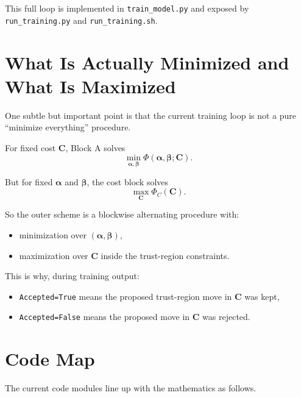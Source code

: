 \documentclass[11pt]{article}
\newcommand{\betavec}{\boldsymbol{\beta}}
\newcommand{\alphavec}{\boldsymbol{\alpha}}
\newcommand{\costvec}{\mathbf{C}}
\begin{document}
This full loop is implemented in \texttt{train\_model.py} and exposed by
\texttt{run\_training.py} and \texttt{run\_training.sh}.

\section{What Is Actually Minimized and What Is Maximized}

One subtle but important point is that the current training loop is not a pure
``minimize everything'' procedure.

For fixed cost $\costvec$, Block A solves
\begin{equation}
\label{eq:min-block-a}
\min_{\alphavec, \betavec}
\Phi(\alphavec, \betavec; \costvec).
\end{equation}

But for fixed $\alphavec$ and $\betavec$, the cost block solves
\begin{equation}
\label{eq:max-cost}
\max_{\costvec} \Phi_C(\costvec).
\end{equation}

So the outer scheme is a blockwise alternating procedure with:
\begin{itemize}
  \item minimization over $(\alphavec, \betavec)$,
  \item maximization over $\costvec$ inside the trust-region constraints.
\end{itemize}

This is why, during training output:
\begin{itemize}
  \item \texttt{Accepted=True} means the proposed trust-region move in
  $\costvec$ was kept,
  \item \texttt{Accepted=False} means the proposed move in $\costvec$ was
  rejected.
\end{itemize}

\section{Code Map}

The current code modules line up with the mathematics as follows.
\end{document}
